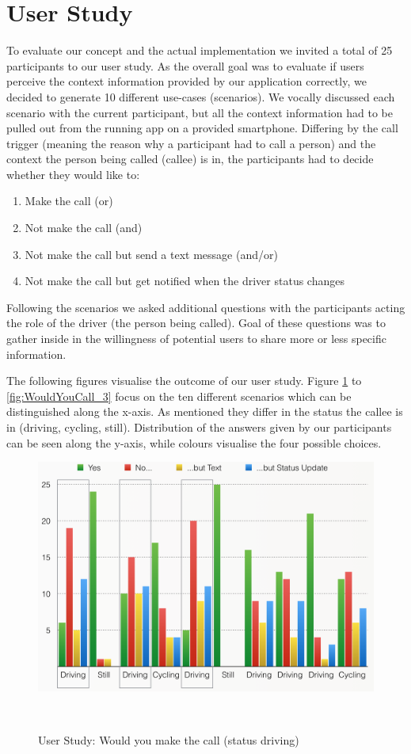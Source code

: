 \documentclass{sigchi}
\begin{document}
\section{User Study}
To evaluate our concept and the actual implementation we invited a total of 25 participants to our user study. As the overall goal was to evaluate if users perceive the context information provided by our application correctly, we decided to generate 10 different use-cases (scenarios). We vocally discussed each scenario with the current participant, but all the context information had to be pulled out from the running app on a provided smartphone. Differing by the call trigger (meaning the reason why a participant had to call a person) and the context the person being called (callee) is in, the participants had to decide whether they would like to: 

\begin{enumerate}
\item Make the call (or)
\item Not make the call (and)
\item Not make the call but send a text message (and/or)
\item Not make the call but get notified when the driver status changes
\end{enumerate}

Following the scenarios we asked additional questions with the participants acting the role of the driver (the person being called). Goal of these questions was to gather inside in the willingness of potential users to share more or less specific information.

The following figures visualise the outcome of our user study. Figure \ref{fig:WouldYouCall_1} to \ref{fig:WouldYouCall_3} focus on the ten different scenarios which can be distinguished along the x-axis. As mentioned they differ in the status the callee is in (driving, cycling, still). Distribution of the answers given by our participants can be seen along the y-axis, while colours visualise the four possible choices.

\begin{figure}[H]
\centering
  \includegraphics[width=0.9\columnwidth]{figures/WouldYouCall_1}
  \caption{User Study: Would you make the call (status driving)}~\label{fig:WouldYouCall_1}
\end{figure}
\end{document}
